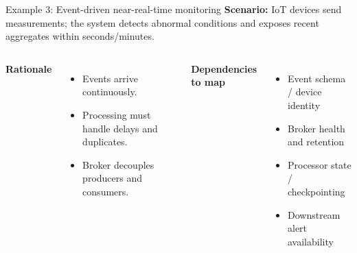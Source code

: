\documentclass[aspectratio=43,10pt]{beamer}
\begin{document}
\begin{frame}{Example 3: Event-driven near-real-time monitoring}
\textbf{Scenario:} IoT devices send measurements; the system detects abnormal conditions and exposes recent aggregates within seconds/minutes.
\vspace{.4em}
\centering
{}
\vspace{-1em}
\begin{columns}[T]
\textbf{Rationale}
\begin{itemize}\item Events arrive continuously.\item Processing must handle delays and duplicates.\item Broker decouples producers and consumers.\end{itemize}
\textbf{Dependencies to map}
\begin{itemize}\item Event schema / device identity\item Broker health and retention\item Processor state / checkpointing\item Downstream alert availability\end{itemize}
\end{columns}
\end{frame}
\end{document}
